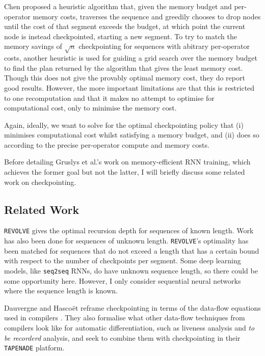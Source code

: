 Chen proposed a heuristic algorithm that, given the memory budget and per-operator memory costs, traverses the sequence and greedily chooses to drop nodes until the cost of that segment exceeds the budget, at which point the current node is instead checkpointed, starting a new segment.
To try to match the memory savings of \(\sqrt{n}\) checkpointing for sequences with abitrary per-operator costs, another heuristic is used for guiding a grid search over the memory budget to find the plan returned by the algorithm that gives the least memory cost.
Though this does not give the provably optimal memory cost, they do report good results.
However, the more important limitations are that this is restricted to one recomputation and that it makes no attempt to optimise for computational cost, only to minimise the memory cost.

Again, ideally, we want to solve for the optimal checkpointing policy that (i) minimises computational cost whilst satisfying a memory budget, and (ii) does so according to the precise per-operator compute and memory costs. 

Before detailing Gruslys et al.'s \cite{Gruslys2016} work on memory-efficient RNN training, which achieves the former goal but not the latter, I will briefly discuss some related work on checkpointing.

\subsection{Related Work}

\texttt{REVOLVE} gives the optimal recursion depth for sequences of known length.
Work has also been done for sequences of unknown length.
\texttt{REVOLVE}'s optimality has been matched for sequences that do not exceed a length that has a certain bound with respect to the number of checkpoints per segment.
Some deep learning models, like \texttt{seq2seq} RNNs, do have unknown sequence length, so there could be some opportunity here.
However, I only consider sequential neural networks where the sequence length is known.

Dauvergne and Hasco\"{e}t reframe checkpointing in terms of the data-flow equations used in compilers \cite{Dauvergne2006}.
They also formalise what other data-flow techniques from compilers look like for automatic differentiation, such as liveness analysis and \textit{to be recorderd} analysis, and seek to combine them with checkpointing in their \texttt{TAPENADE} platform.

